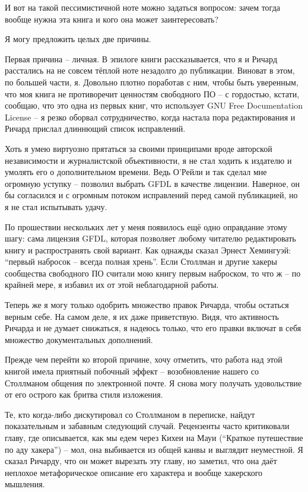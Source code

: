 И вот на такой пессимистичной ноте можно задаться вопросом: зачем
тогда вообще нужна эта книга и кого она может заинтересовать?

Я могу предложить целых две причины.

Первая причина -- личная. В эпилоге книги рассказывается, что я и
Ричард расстались на не совсем тёплой ноте незадолго до публикации.
Виноват в этом, по большей части, я. Довольно плотно поработав с ним,
чтобы быть уверенным, что моя книга не противоречит ценностям
свободного ПО -- с гордостью, кстати, сообщаю, что это одна из первых
книг, что использует GNU Free Documentation License -- я резко оборвал
сотрудничество, когда настала пора редактирования и Ричард прислал
длиннющий список исправлений.

Хоть я умею виртуозно прятаться за своими принципами вроде
авторской независимости и журналистской объективности, я не стал
ходить к издателю и умолять его о дополнительном времени. Ведь
О'Рейли и так сделал мне огромную уступку -- позволил выбрать GFDL
в качестве лицензии. Наверное, он бы согласился и с огромным потоком
исправлений перед самой публикацией, но я не стал испытывать удачу.

По прошествии нескольких лет у меня появилось ещё одно оправдание
этому шагу: сама лицензия GFDL, которая позволяет любому читателю
редактировать книгу и распространять свой вариант. Как однажды
сказал Эрнест Хемингуэй: ``первый набросок -- всегда полная хрень''.
Если Столлман и другие хакеры сообщества свободного ПО считали
мою книгу первым наброском, то что ж -- по крайней мере, я избавил
их от этой неблагодарной работы.

Теперь же я могу только одобрить множество правок Ричарда, чтобы
остаться верным себе. На самом деле, я их даже приветствую. Видя, что
активность Ричарда и не думает снижаться, я надеюсь только, что его
правки включат в себя множество документальных дополнений.

Прежде чем перейти ко второй причине, хочу отметить, что работа над
этой книгой имела приятный побочный эффект -- возобновление нашего
со Столлманом общения по электронной почте. Я снова могу получать
удовольствие от его острого как бритва стиля изложения.

Те, кто когда-либо дискутировал со Столлманом в переписке, найдут
показательным и забавным следующий случай. Рецензенты часто критиковали
главу, где описывается, как мы едем через Кихеи на Мауи (``Краткое
путешествие по аду хакера'') -- мол, она выбивается из общей канвы
и выглядит неуместной. Я сказал Ричарду, что он может вырезать эту
главу, но заметил, что она даёт неплохое метафорическое описание
его характера и вообще хакерского мышления.

